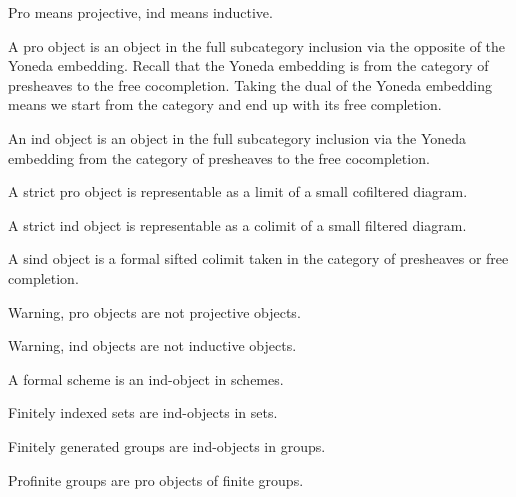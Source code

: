 Pro means projective, ind means inductive.

\begin{definition}
    \label{definition-pro-object}
    A pro object is an object in the full subcategory inclusion via the opposite of the Yoneda embedding. Recall that the Yoneda embedding is from the category of presheaves to the free cocompletion. Taking the dual of the Yoneda embedding means we start from the category and end up with its free completion.
\end{definition}

\begin{definition}
    \label{definition-ind-object}
    An ind object is an object in the full subcategory inclusion via the Yoneda embedding from the category of presheaves to the free cocompletion.
\end{definition}

\begin{definition}
    \label{definition-strict-pro-object}
    A strict pro object is representable as a limit of a small cofiltered diagram.
\end{definition}

\begin{definition}
    \label{definition-strict-ind-object}
    A strict ind object is representable as a colimit of a small filtered diagram.
\end{definition}

\begin{definition}
    \label{definition-sifted-ind-object}
    A sind object is a formal sifted colimit taken in the category of presheaves or free completion.
\end{definition}

\begin{remark}
    Warning, pro objects are not projective objects.

    Warning, ind objects are not inductive objects.
\end{remark}

\begin{example}
    A formal scheme is an ind-object in schemes.

    Finitely indexed sets are ind-objects in sets.

    Finitely generated groups are ind-objects in groups.

    Profinite groups are pro objects of finite groups.
\end{example}

